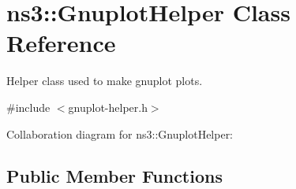 \hypertarget{classns3_1_1GnuplotHelper}{}\section{ns3\+:\+:Gnuplot\+Helper Class Reference}
\label{classns3_1_1GnuplotHelper}


Helper class used to make gnuplot plots.  




{\ttfamily \#include $<$gnuplot-\/helper.\+h$>$}



Collaboration diagram for ns3\+:\+:Gnuplot\+Helper\+:
\subsection*{Public Member Functions}
